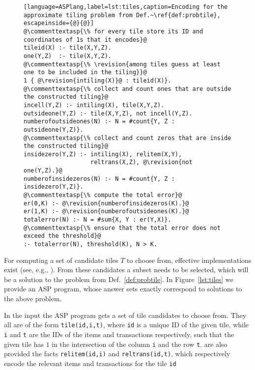 \begin{figure}[t]
\small{ \begin{lstlisting}[language=ASPlang,label=lst:tiles,caption=Encoding for the approximate tiling problem from Def.~\ref{def:probtile}, escapeinside={@}{@}]
@\commenttextasp{\% for every tile store its ID and coordinates of 1s that it encodes}@
tileid(X) :- tile(X,Y,Z).
one(Y,Z)  :- tile(X,Y,Z).
@\commenttextasp{\% \revision{among tiles guess at least one to be included in the tiling}}@
1 { @\revision{intiling(X)}@ : tileid(X)}.
@\commenttextasp{\% collect and count ones that are outside the constructed tiling}@
incell(Y,Z) :- intiling(X), tile(X,Y,Z).
outsideone(Y,Z) :- tile(X,Y,Z), not incell(Y,Z).
numberofoutsideones(N) :- N = #count{Y, Z : outsideone(Y,Z)}.
@\commenttextasp{\% collect and count zeros that are inside the constructed tiling}@
insidezero(Y,Z) :- intiling(X), relitem(X,Y), 
                   reltrans(X,Z), @\revision{not one(Y,Z).}@ 
numberofinsidezeros(N) :- N = #count{Y, Z : insidezero(Y,Z)}.
@\commenttextasp{\% compute the total error}@
er(0,K) :- @\revision{numberofinsidezeros(K).}@
er(1,K) :- @\revision{numberofoutsideones(K).}@
totalerror(N) :- N = #sum{X, Y : er(Y,X)}.
@\commenttextasp{\% ensure that the total error does not exceed the threshold}@
:- totalerror(N), threshold(K), N > K.
\end{lstlisting}}
\end{figure}

For computing a set of candidate tiles $T$ to choose from, effective implementations exist
(see, e.g., \textcite{tyukin14bmad}). From these candidates a subset needs to be selected, which will be a solution to the problem from Def.~\ref{def:probtile}. In Figure~\ref{lst:tiles} we provide an ASP program, whose answer sets exactly correspond to solutions to the above problem.

In the input the ASP program gets a set of tile candidates to choose from. They all are of the form \texttt{tile(id,i,t)}, where \texttt{id} is a unique ID of the given tile, while \texttt{i} and \texttt{t} are the IDs of the items and transactions respectively, such that the given tile has $1$ in the intersection of the column \texttt{i} and the row \texttt{t}.  %
are also provided  the facts \texttt{relitem(id,i)} and \texttt{reltrans(id,t)}, which respectively encode the relevant items and transactions for the tile \texttt{id}  

